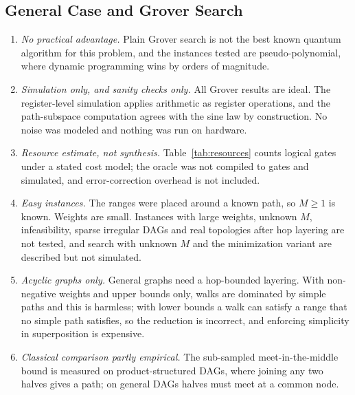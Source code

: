 \documentclass[journal]{IEEEtran}
\begin{document}
\subsection{General Case and Grover Search}
\begin{enumerate}
  \item \emph{No practical advantage.} Plain Grover search is not the best known quantum algorithm for this problem, and the instances tested are pseudo-polynomial, where dynamic programming wins by orders of magnitude.
  \item \emph{Simulation only, and sanity checks only.} All Grover results are ideal. The register-level simulation applies arithmetic as register operations, and the path-subspace computation agrees with the sine law by construction. No noise was modeled and nothing was run on hardware.
  \item \emph{Resource estimate, not synthesis.} Table~\ref{tab:resources} counts logical gates under a stated cost model; the oracle was not compiled to gates and simulated, and error-correction overhead is not included.
  \item \emph{Easy instances.} The ranges were placed around a known path, so $M\ge1$ is known. Weights are small. Instances with large weights, unknown $M$, infeasibility, sparse irregular DAGs and real topologies after hop layering are not tested, and search with unknown $M$ and the minimization variant are described but not simulated.
  \item \emph{Acyclic graphs only.} General graphs need a hop-bounded layering. With non-negative weights and upper bounds only, walks are dominated by simple paths and this is harmless; with lower bounds a walk can satisfy a range that no simple path satisfies, so the reduction is incorrect, and enforcing simplicity in superposition is expensive.
  \item \emph{Classical comparison partly empirical.} The sub-sampled meet-in-the-middle bound is measured on product-structured DAGs, where joining any two halves gives a path; on general DAGs halves must meet at a common node.
\end{enumerate}
\end{document}
